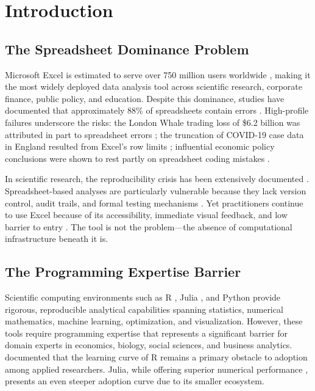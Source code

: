 
\section{Introduction}
\label{sec:introduction}

\subsection{The Spreadsheet Dominance Problem}

Microsoft Excel is estimated to serve over 750 million users worldwide \citep{Microsoft2023}, making it the most widely deployed data analysis tool across scientific research, corporate finance, public policy, and education. Despite this dominance, studies have documented that approximately 88\% of spreadsheets contain errors \citep{Panko2016}. High-profile failures underscore the risks: the London Whale trading loss of \$6.2 billion was attributed in part to spreadsheet errors \citep{JPMorgan2013}; the truncation of COVID-19 case data in England resulted from Excel's row limits \citep{Kelion2020}; influential economic policy conclusions were shown to rest partly on spreadsheet coding mistakes \citep{Herndon2014}.

In scientific research, the reproducibility crisis has been extensively documented \citep{Baker2016, Ioannidis2005}. Spreadsheet-based analyses are particularly vulnerable because they lack version control, audit trails, and formal testing mechanisms \citep{Peng2011}. Yet practitioners continue to use Excel because of its accessibility, immediate visual feedback, and low barrier to entry \citep{Scaffidi2005}. The tool is not the problem---the absence of computational infrastructure beneath it is.

\subsection{The Programming Expertise Barrier}

Scientific computing environments such as R \citep{RCoreTeam2024}, Julia \citep{Bezanson2017}, and Python \citep{VanRossum2009} provide rigorous, reproducible analytical capabilities spanning statistics, numerical mathematics, machine learning, optimization, and visualization. However, these tools require programming expertise that represents a significant barrier for domain experts in economics, biology, social sciences, and business analytics. \citet{Muenchen2012} documented that the learning curve of R remains a primary obstacle to adoption among applied researchers. Julia, while offering superior numerical performance \citep{Bezanson2017}, presents an even steeper adoption curve due to its smaller ecosystem.


